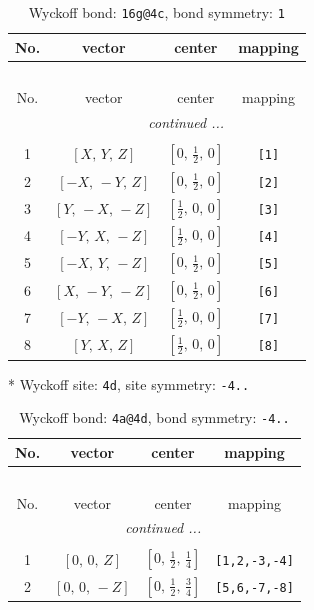 \documentclass[fleqn,8pt]{jsarticle}
\begin{document}
\begin{longtable}{cccc}
\caption{Wyckoff bond: {\tt 16g@4c}, bond symmetry: {\tt 1}}
 \\
 \hline \hline
No. & vector & center & mapping \\ \hline \endfirsthead

\multicolumn{3}{l}{\tablename\ \thetable{}} \\
 \hline \hline
No. & vector & center & mapping \\ \hline \endhead

 \hline \hline
\multicolumn{3}{r}{\footnotesize\it continued ...} \\ \endfoot

 \hline \hline
\multicolumn{3}{r}{} \\ \endlastfoot

1 & $\left[ X,\, Y,\, Z \right]$ & $\left[ 0,\, \frac{1}{2},\, 0 \right]$ & {\tt [1]} \\ \hline
2 & $\left[ - X,\, - Y,\, Z \right]$ & $\left[ 0,\, \frac{1}{2},\, 0 \right]$ & {\tt [2]} \\ \hline
3 & $\left[ Y,\, - X,\, - Z \right]$ & $\left[ \frac{1}{2},\, 0,\, 0 \right]$ & {\tt [3]} \\ \hline
4 & $\left[ - Y,\, X,\, - Z \right]$ & $\left[ \frac{1}{2},\, 0,\, 0 \right]$ & {\tt [4]} \\ \hline
5 & $\left[ - X,\, Y,\, - Z \right]$ & $\left[ 0,\, \frac{1}{2},\, 0 \right]$ & {\tt [5]} \\ \hline
6 & $\left[ X,\, - Y,\, - Z \right]$ & $\left[ 0,\, \frac{1}{2},\, 0 \right]$ & {\tt [6]} \\ \hline
7 & $\left[ - Y,\, - X,\, Z \right]$ & $\left[ \frac{1}{2},\, 0,\, 0 \right]$ & {\tt [7]} \\ \hline
8 & $\left[ Y,\, X,\, Z \right]$ & $\left[ \frac{1}{2},\, 0,\, 0 \right]$ & {\tt [8]} \\
\end{longtable}
* Wyckoff site: {\tt 4d}, site symmetry: {\tt -4..}
\renewcommand{\arraystretch}{1.2}
\begin{longtable}{cccc}
\caption{Wyckoff bond: {\tt 4a@4d}, bond symmetry: {\tt -4..}}
 \\
 \hline \hline
No. & vector & center & mapping \\ \hline \endfirsthead

\multicolumn{3}{l}{\tablename\ \thetable{}} \\
 \hline \hline
No. & vector & center & mapping \\ \hline \endhead

 \hline \hline
\multicolumn{3}{r}{\footnotesize\it continued ...} \\ \endfoot

 \hline \hline
\multicolumn{3}{r}{} \\ \endlastfoot

1 & $\left[ 0,\, 0,\, Z \right]$ & $\left[ 0,\, \frac{1}{2},\, \frac{1}{4} \right]$ & {\tt [1,2,-3,-4]} \\ \hline
2 & $\left[ 0,\, 0,\, - Z \right]$ & $\left[ 0,\, \frac{1}{2},\, \frac{3}{4} \right]$ & {\tt [5,6,-7,-8]} \\
\end{longtable}
\end{document}
